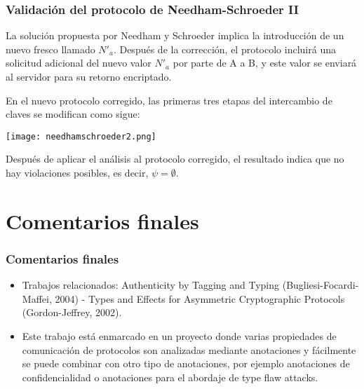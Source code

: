 \documentclass{beamer}
\begin{document}
\begin{frame}
    \frametitle{Validación del protocolo de Needham-Schroeder II}
    \pause
    La solución propuesta por Needham y Schroeder implica la introducción de un nuevo fresco llamado $N'_a$. Después de la corrección, el protocolo incluirá una solicitud adicional del nuevo valor $N'_a$ por parte de A a B, y este valor se enviará al servidor para su retorno encriptado.

    En el nuevo protocolo corregido, las primeras tres etapas del intercambio de claves se modifican como sigue:

    \begin{center}
        \texttt{[image: needhamschroeder2.png]}
    \end{center}

    Después de aplicar el análisis al protocolo corregido, el resultado indica que no hay violaciones posibles, es decir, $\psi = \emptyset$. 
\end{frame}

\section{Comentarios finales}

\begin{frame}
    \frametitle{Comentarios finales}
    \pause 
    \begin{itemize}
    \item<2-> Trabajos relacionados: Authenticity by Tagging and Typing (Bugliesi-Focardi-Maffei, 2004) - Types and Effects for Asymmetric Cryptographic Protocols (Gordon-Jeffrey, 2002).
    \item<3-> Este trabajo está enmarcado en un proyecto donde varias propiedades de comunicación de protocolos son analizadas mediante anotaciones y fácilmente se puede combinar con otro tipo de anotaciones, por ejemplo anotaciones de confidencialidad o anotaciones para el abordaje de type flaw attacks.
    \end{itemize}
\end{frame}
\end{document}
